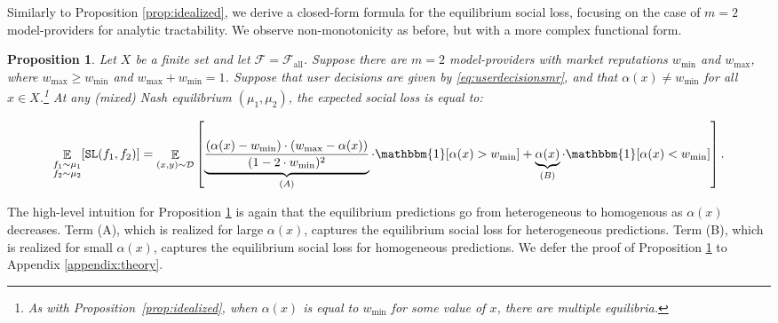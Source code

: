\documentclass[letterpaper,11pt]{article}
\newtheorem{proposition}{Proposition}
\theoremstyle{plain}
\DeclareMathOperator*{\E}{\mathbb{E}}
\begin{document}
Similarly to Proposition \ref{prop:idealized}, we derive a closed-form formula for the equilibrium social loss, focusing on the case of $m = 2$ model-providers for analytic tractability. We observe non-monotonicity as before, but with a more complex functional form. 
\begin{proposition}
\label{prop:2model-providers}
Let $X$ be a finite set and let $\mathcal{F} = \mathcal{F}_{\text{all}}$. Suppose there are $m=2$ model-providers with market reputations $w_{\text{min}}$ and $w_{\text{max}}$, where $w_{\text{max}} \ge w_{\text{min}}$ and $w_{\text{max}} +  w_{\text{min}} = 1$. Suppose that user decisions are given by \eqref{eq:userdecisionsmr}, and that $\alpha(x) \neq w_{\text{min}}$ for all $x \in X$.\footnote{As with Proposition~\ref{prop:idealized}, when $\alpha(x)$ is equal to $w_{\text{min}}$ for some value of $x$, there are multiple equilibria.} At any (mixed) Nash equilibrium $(\mu_1, \mu_2)$, the expected social loss  is equal to: 

\begin{equation}
\label{eq:2model-providerssocialloss} 
\E_{\substack{f_1 \sim \mu_1 \\ f_2 \sim \mu_2}}[\texttt{SL}(f_1, f_2)] = \E_{(x, y) \sim \mathcal{D}} \left[\underbrace{\frac{(\alpha(x) - w_{\text{min}}) \cdot (w_{\text{max}}  - \alpha(x))}{(1 - 2 \cdot w_{\text{min}})^2}}_{(A)} \cdot \mathbbm{1}[\alpha(x) > w_{\text{min}} ]  + \underbrace{\alpha(x)}_{(B)} \cdot \mathbbm{1}[\alpha(x) < w_{\text{min}} ]  \right]. 
\end{equation}
\end{proposition}

\normalsize{}

The high-level intuition for Proposition \ref{prop:2model-providers} is again  that the equilibrium predictions go from heterogeneous to homogenous as $\alpha(x)$ decreases. Term (A), which is realized for large $\alpha(x)$, captures the equilibrium social loss for heterogeneous predictions. Term (B), which is realized for small $\alpha(x)$, captures the equilibrium social loss for homogeneous predictions. We defer the proof of Proposition \ref{prop:2model-providers} to Appendix \ref{appendix:theory}. 
\end{document}
